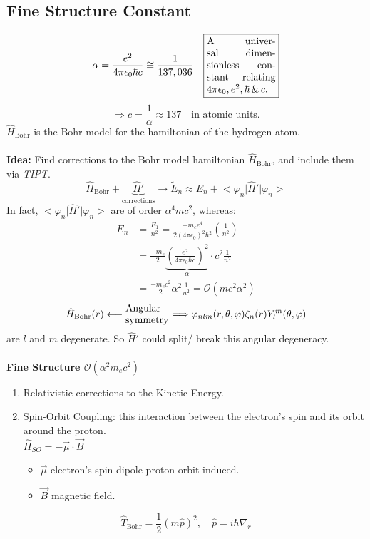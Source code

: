 \documentclass[12pt,fancychapters]{report}
\numberwithin{equation}{section}
\begin{document}
\subsection{Fine Structure Constant}
\[
  \alpha = \frac{e^2}{4\pi \epsilon_0 \hbar c} \cong \frac{1}{137,036}\quad
    \fbox{%
  \parbox{.2\textwidth}{%
  A universal dimensionless constant relating $4\pi\epsilon_0, e^2, \hbar\,\&\, c.$}%
}
\]
\[
  \Rightarrow c = \frac{1}{\alpha} \approx 137\quad \text{in atomic units.} 
\]
$\hat{H}_\text{Bohr}$ is the Bohr model for the hamiltonian of the hydrogen atom.\\
\\
\textbf{Idea:} Find corrections to the Bohr model hamiltonian $\hat{H}_\text{Bohr}$, and include
them via \emph{TIPT}.
\[
  \hat{H}_\text{Bohr} + \underbrace{\hat{H}'}_\text{corrections} \longrightarrow 
  \tilde{E}_n \approx E_n + \big<\varphi_n\big|\hat{H}'\big|\varphi_n\big>
\]
In fact, $\big<\varphi_n\big|\hat{H}'\big|\varphi_n\big>$ are of order $\alpha^4 m c^2$, whereas: 
\begin{align*}
  E_n &= \frac{E_1}{n^2} = \frac{-m_e e^4}{2(4\pi\epsilon_0)^2\hbar^2}\left(\frac{1}{n^2}\right)\\
      &= \frac{-m_e}{2}\underbrace{\left(\frac{e^2}{4\pi\epsilon_0 \hbar c}\right)^2}_\alpha
      \cdot c^2 \frac{1}{n^2}\\
      &= \frac{-m_e c^2}{2} \alpha^2 \frac{1}{n^2} = \mathcal{O}(mc^2\alpha^2)
\end{align*}
\[
  \hat{H}_\text{Bohr} (r) \longleftarrow \parbox{0.13\textwidth}{Angular symmetry}
  \Longrightarrow \varphi_{nlm}(r, \theta, \varphi)\zeta_n (r)Y_l^m (\theta,\varphi) 
\]
are $l$ and $m$ degenerate. So $\hat{H}'$ could split/ break this angular degeneracy.\\
\\
\textbf{Fine Structure $\mathcal{O}(\alpha^2 m_e c^2)$}
\begin{enumerate}
  \item Relativistic corrections to the Kinetic Energy.
  \item Spin-Orbit Coupling: this interaction between the electron's spin and its orbit around the 
    proton.\\
    $ \hat{H}_{SO} = -\vec{\mu}\cdot \vec{B}$
    \begin{itemize}
    \item $\vec{\mu}$ electron's spin dipole proton orbit induced.
    \item $\vec{B}$ magnetic field.
    \end{itemize}
\end{enumerate}
\[
  \hat{T}_\text{Bohr} = \frac{1}{2}(m\hat{p})^2, \quad \hat{p} = i \hbar \nabla_r
\]
\end{document}
